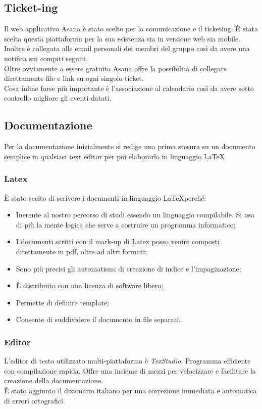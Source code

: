 \documentclass[12pt,a4paper,titlepage]{article}
\begin{document}
\subsection{Ticket-ing}
Il web applicativo Asana è stato scelto per la comunicazione e il ticketing. È stata scelta questa piattaforma per la sua esistenza sia in versione web sia mobile.
Inoltre è collegata alle email personali dei membri del gruppo così da avere una notifica sui compiti seguiti.\\
Oltre ovviamente a essere gratuito Asana offre la possibilità di collegare direttamente file e link su ogni singolo ticket. \\
Cosa infine forse più importante è l'associazione al calendario così da avere sotto controllo migliore gli eventi datati.
\subsection{Documentazione}
Per la documentazione inizialmente si redige una prima stesura su un documento semplice in qualsiasi text editor per poi elaborarlo in linguaggio \LaTeX.
\subsubsection{Latex}
È stato scelto di scrivere i documenti in linguaggio \LaTeX perché:
\begin{itemize}
	\item Inerente al nostro percorso di studi essendo un linguaggio compilabile. Si usa di più la mente logica che serve a costruire un programma informatico;
	\item I documenti scritti con il mark-up di Latex posso venire composti direttamente in pdf, oltre ad altri formati;
	\item Sono più precisi gli automatismi di creazione di indice e l'impaginazione;
	\item È distribuito con una licenza di software libero;
	\item Permette di definire template;
	\item Consente di suddividere il documento in file separati.
\end{itemize} 
\subsubsection{Editor}
L'editor di testo utilizzato multi-piattaforma è \textit{TexStudio}. Programma efficiente con compilazione rapida. Offre una insieme di mezzi per velocizzare e facilitare la creazione della documentazione.\\
È stato aggiunto il dizionario italiano per una correzione immediata e automatica di errori ortografici.
\end{document}
